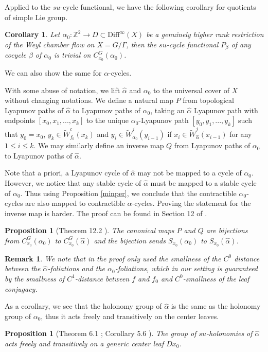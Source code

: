 \documentclass[11pt]{amsart}
\numberwithin{equation}{section}
\newcommand{\Z}{\mathbb{Z}}
\theoremstyle{plain}
\newtheorem{prop}[thm]{Proposition}
\newtheorem{cor}[thm]{Corollary}
\newtheorem{rmk}[thm]{Remark}
\begin{document}
Applied to the $su$-cycle functional, we have the following corollary for quotients of simple Lie group.
\begin{cor}\label{trifunc}
 Let $\alpha_0:\Z^2\to D\subset \mathrm{Diff}^\infty(X)$ be a genuinely higher rank restriction of the Weyl chamber flow on $X=G/\Gamma$, then the $su$-cycle functional $P_\beta$ of any cocycle $\beta$ of $\alpha_0$ is trivial on $C^G_{x_0}(\alpha_0)$.
\end{cor}


We can also show the same for $\alpha$-cycles.

With some abuse of notation, we lift $\hat{\alpha}$ and $\alpha_0$ to the universal cover of $X$ without changing notations. We define a natural map $P$ from topological Lyapunov paths of $\hat{\alpha}$ to Lyapunov paths of $\alpha_0$, taking an $\hat{\alpha}$ Lyapunov path with endpoints $[x_0,x_1,...,x_k]$ to the unique $\alpha_0$-Lyapunov path $[y_0,y_1,..., y_k]$ such that $y_0=x_0$, $y_k\in \tilde{W}^c_{f_0}(x_k)$ and $y_i\in \tilde{W}_{\alpha_0}^j(y_{i-1})$ if $x_i\in \tilde{W}_{\hat{\alpha}}^j(x_{i-1})$ for any $1\le i \le k$. We may similarly define an inverse map $Q$ from Lyapunov paths of $\alpha_0$ to Lyapunov paths of $\hat{\alpha}$.

Note that a priori, a Lyapunov cycle of $\hat{\alpha}$ may not be mapped to a cycle of $\alpha_0$. However, we notice that any stable cycle of $\hat{\alpha}$ must be mapped to a stable cycle of $\alpha_0$. Thus using Proposition \ref{minper}, we conclude that the contractible $\alpha_0$-cycles are also mapped to contractible $\alpha$-cycles. Proving the statement for the inverse map is harder. The proof can be found in Section 12 of \cite{VinWang}.
\begin{prop}[Theorem 12.2 \cite{VinWang}] \label{bijalpha}
 The canonical maps $P$ and $Q$ are bijections from $C^G_{x_0}(\alpha_0)$ to $C^G_{x_0}(\hat{\alpha})$ and the bijection sends $S_{x_0}(\alpha_0)$ to $S_{x_0}(\hat{\alpha})$.
\end{prop}
\begin{rmk}
 We note that in \cite{VinWang} the proof only used the smallness of the $C^0$ distance between the $\hat{\alpha}$-foliations and the $\alpha_0$-foliations, which in our setting is guaranteed by the smallness of $C^1$-distance between $f$ and $f_0$ and $C^0$-smallness of the leaf conjugacy.
\end{rmk}

As a corollary, we see that the holonomy group of $\hat{\alpha}$ is the same as the holonomy group of $\alpha_0$, thus it acts freely and transitively on the center leaves. 
\begin{prop}[Theorem 6.1 \cite{DK}; Corollary 5.6 \cite{Vinhage}]\label{hologroup}
 The group of $su$-holonomies of $\hat{\alpha}$ acts freely and transitively on a generic center leaf $Dx_0$.
\end{prop}
\end{document}
